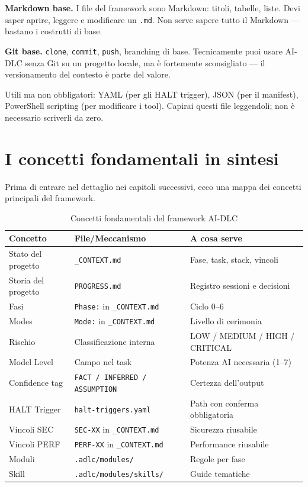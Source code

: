 \textbf{Markdown base.} I file del framework sono Markdown: titoli, tabelle, liste. Devi saper aprire, leggere e modificare un \texttt{.md}. Non serve sapere tutto il Markdown --- bastano i costrutti di base.

\textbf{Git base.} \texttt{clone}, \texttt{commit}, \texttt{push}, branching di base. Tecnicamente puoi usare AI-DLC senza Git su un progetto locale, ma è fortemente sconsigliato --- il versionamento del contesto è parte del valore.

Utili ma non obbligatori: YAML (per gli HALT trigger), JSON (per il manifest), PowerShell scripting (per modificare i tool). Capirai questi file leggendoli; non è necessario scriverli da zero.

\section{I concetti fondamentali in sintesi}
\label{sec:01-concetti}

Prima di entrare nel dettaglio nei capitoli successivi, ecco una mappa dei concetti principali del framework.

\begin{table}[htbp]
  \centering
  \begin{tabular}{lll}
    \toprule
    \textbf{Concetto} & \textbf{File/Meccanismo} & \textbf{A cosa serve} \\
    \midrule
    Stato del progetto & \texttt{\_CONTEXT.md} & Fase, task, stack, vincoli \\
    Storia del progetto & \texttt{PROGRESS.md} & Registro sessioni e decisioni \\
    Fasi & \texttt{Phase:} in \texttt{\_CONTEXT.md} & Ciclo 0--6 \\
    Modes & \texttt{Mode:} in \texttt{\_CONTEXT.md} & Livello di cerimonia \\
    Rischio & Classificazione interna & LOW / MEDIUM / HIGH / CRITICAL \\
    Model Level & Campo nel task & Potenza AI necessaria (1--7) \\
    Confidence tag & \texttt{FACT / INFERRED / ASSUMPTION} & Certezza dell'output \\
    HALT Trigger & \texttt{halt-triggers.yaml} & Path con conferma obbligatoria \\
    Vincoli SEC & \texttt{SEC-XX} in \texttt{\_CONTEXT.md} & Sicurezza riusabile \\
    Vincoli PERF & \texttt{PERF-XX} in \texttt{\_CONTEXT.md} & Performance riusabile \\
    Moduli & \texttt{.adlc/modules/} & Regole per fase \\
    Skill & \texttt{.adlc/modules/skills/} & Guide tematiche \\
    \bottomrule
  \end{tabular}
  \caption{Concetti fondamentali del framework AI-DLC}
  \label{tab:01-concetti}
\end{table}

